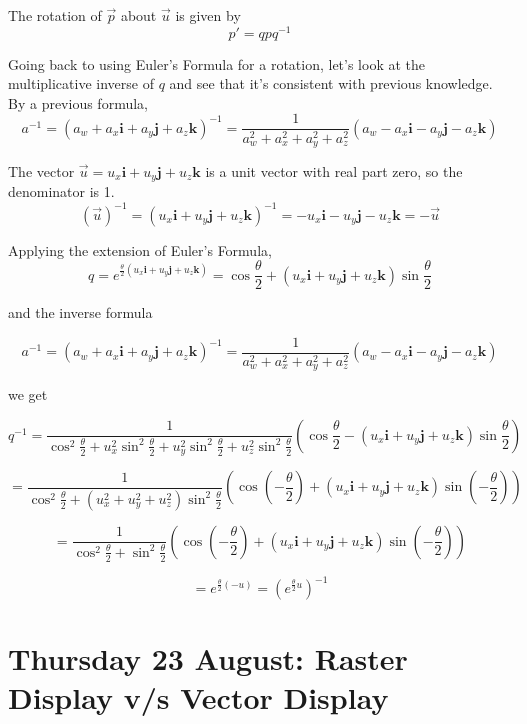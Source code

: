 \documentclass[12pt]{article}
\begin{document}
\begin{spacing}{1.2}
The rotation of $\vec{p}$ about $\vec{u}$ is given by 
$$p' = q p q^{-1}$$

Going back to using Euler's Formula for a rotation, let's look at the multiplicative inverse of $q$ and see that it's consistent with previous knowledge.  By a previous formula, 
$$a^{-1} = (a_w + a_x \mathbf{i} + a_y \mathbf{j} + a_z \mathbf{k})^{-1} = 
\frac{1}{a_w^2 + a_x^2 + a_y^2 + a_z^2} (a_w - a_x \mathbf{i} - a_y \mathbf{j} - a_z \mathbf{k} )$$

The vector $\vec{u} = u_x \mathbf{i} + u_y \mathbf{j} + u_z \mathbf{k}$ is a unit vector with real part zero, so the denominator is 1.  
$$(\vec{u})^{-1} = (u_x \mathbf{i} + u_y \mathbf{j} + u_z \mathbf{k})^{-1} = -u_x \mathbf{i} - u_y \mathbf{j} - u_z \mathbf{k} = -\vec{u}$$

Applying the extension of Euler's Formula, 
$$q = e^{ 
	\frac{\theta}{2}
	( u_x \mathbf{i} + u_y \mathbf{j} + u_z \mathbf{k} )
	}
=
	\cos \frac{\theta}{2} + ( u_x \mathbf{i} + u_y \mathbf{j} + u_z \mathbf{k} ) \sin \frac{\theta}{2}
$$

and the inverse formula

$$a^{-1} = (a_w + a_x \mathbf{i} + a_y \mathbf{j} + a_z \mathbf{k})^{-1} = 
\frac{1}{a_w^2 + a_x^2 + a_y^2 + a_z^2} (a_w - a_x \mathbf{i} - a_y \mathbf{j} - a_z \mathbf{k} )$$

we get

$$q^{-1} = \frac{1}{
	\cos^2 \frac{\theta}{2}
	 + u_x^2 \sin ^2 \frac{\theta}{2}
	 + u_y^2 \sin ^2 \frac{\theta}{2}
	 + u_z^2 \sin ^2 \frac{\theta}{2}
	}
	\left(\cos \frac{\theta}{2} - ( u_x \mathbf{i} + u_y \mathbf{j} + u_z \mathbf{k} ) \sin \frac{\theta}{2}\right)
$$

$$ = \frac{1}{
	\cos^2 \frac{\theta}{2}
	 + (u_x^2 
	 + u_y^2 
	 + u_z^2) \sin ^2 \frac{\theta}{2}
	}
	\left(\cos \left( - \frac{\theta}{2} \right) + ( u_x \mathbf{i} + u_y \mathbf{j} + u_z \mathbf{k} ) \sin \left(-\frac{\theta}{2}\right)\right)
$$

$$ = \frac{1}{
	\cos^2 \frac{\theta}{2}
	+ \sin ^2 \frac{\theta}{2}
	}
	\left(\cos \left( - \frac{\theta}{2} \right) + ( u_x \mathbf{i} + u_y \mathbf{j} + u_z \mathbf{k} ) \sin \left(-\frac{\theta}{2}\right)\right)
$$

$$ = e^{\frac{\theta}{2}(-u)} = \left(e^{\frac{\theta}{2}u}\right)^{-1}
$$

\section{Thursday 23 August:  Raster Display v/s Vector Display}


\end{spacing}
\end{document}

